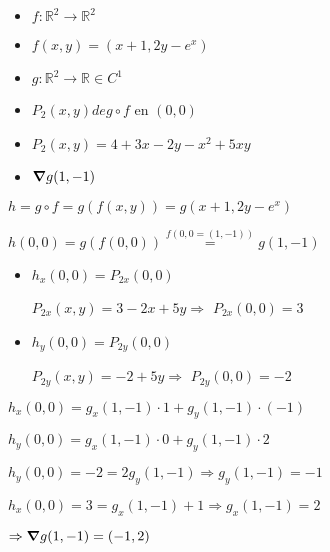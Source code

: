 \documentclass[../practica_05.tex]{subfiles}
\begin{document}
    \begin{itemize}
        \item $f: \mathbb{R}^2 \to \mathbb{R}^2$
        \item $f(x,y) = (x+1,2y-e^x)$
        \item $g: \mathbb{R}^2 \to \mathbb{R} \in C^1$
        \item $P_2(x,y) de g \circ f $ en $(0,0)$
        \item $P_2(x,y) = 4 + 3x - 2y - x^2 + 5xy$
        \item $\grad g(1,-1)$
    \end{itemize}

    $ h = g \circ f = g(f(x,y)) = g(x+1,2y-e^x) $

    $ h(0,0) = g(f(0,0)) \stackrel{f(0,0 = (1,-1))}{=} g(1,-1) $

    \begin{itemize}
        \item $ h_x(0,0) = P_{2x}(0,0) $
        
            $ P_{2x}(x,y) = 3 - 2x + 5y \Rightarrow$
            $ P_{2x}(0,0) = 3 $

        \item $ h_y(0,0) = P_{2y}(0,0) $

            $ P_{2y}(x,y) = -2 + 5y \Rightarrow$
            $ P_{2y}(0,0) = -2 $
    \end{itemize}

    $ h_x(0,0) = g_x(1,-1)\cdot 1 + g_y(1,-1) \cdot (- 1) $

    $ h_y(0,0) = g_x(1,-1)\cdot 0 + g_y(1,-1) \cdot 2 $

    $ h_y(0,0) = -2 = 2g_y(1,-1) \Rightarrow g_y(1,-1) = -1 $

    $ h_x(0,0) = 3 = g_x(1,-1) + 1 \Rightarrow g_x(1,-1) = 2 $

    $\Rightarrow \grad g(1,-1) = (-1,2)$
\end{document}
